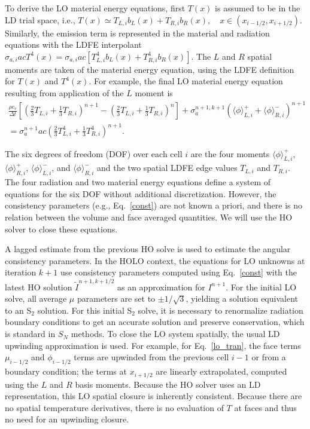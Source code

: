 \documentclass{mc2013}
\newcommand{\mom}[1]{\langle #1 \rangle}
\newcommand{\ir}{{i+1/2}}
\begin{document}
To derive the LO material energy equations, first $T(x)$ is assumed to be in the LD trial space, i.e.,
$ T(x) \simeq T_{L,i} b_L(x) + T_{R,i} b_R(x),\quad x\in(x_{i-1/2},x_\ir)$.
Similarly, the emission term is represented in the material and radiation equations with the LDFE
interpolant $\sigma_{a,i}acT^4(x) = \sigma_{a,i}ac\left[T_{L,i}^4 b_{L}(x) +
T_{R,i}^4 b_R(x)\right]$.  
 The $L$ and $R$ spatial moments are taken of the material energy equation, using the
 LDFE
 definition for $T(x)$ and $T^4(x)$. For example, the final LO material energy
 equation resulting from application of the $L$ moment is
\begin{multline}
    \frac{\rho c_v}{\Delta t}\left[ \left(\frac{2}{3}T_{L,i} + \frac{1}{3}T_{R,i}
        \right)^{n+1} - \left(\frac{2}{3}T_{L,i} + \frac{1}{3}T_{R,i}
    \right)^{n} \right]  + \sigma_a^{n+1,k+1} \left( \mom{\phi}_{L,i}^+ +
    \mom{\phi}_{R,i}^- \right)^{n+1} \\ = \sigma_a^{n+1}a c
\left( \frac{2}{3} T_{L,i}^4 + \frac{1}{3}T_{R,i}^4
        \right)^{n+1}.
\end{multline}


The six degrees of freedom (DOF) over each cell $i$ are the four moments $\mom{\phi}_{L,i}^+$,
$\mom{\phi}_{R,i}^+$, $\mom{\phi}_{L,i}^-$, and $\mom{\phi}_{R,i}^-$ and the two
spatial LDFE edge values $T_{L,i}$ and $T_{R,i}$. The four radiation and two material
energy equations define a system of equations for the six DOF without additional
discretization.  However, the consistency parameters (e.g., Eq.~\eqref{const}) are not known a priori, and
there is no relation between the volume and face averaged quantities. We will use the
HO solver to close these equations.  

A lagged estimate from the previous HO solve is
used to estimate the angular consistency parameters. In the HOLO
context, the equations for LO unknowns at iteration $k+1$ use consistency parameters
computed using Eq.~\eqref{const} with the latest HO solution $\tilde{I}^{n+1,k+1/2}$
as an approximation for $I^{n+1}$. For the initial LO
solve, all average $\mu$ parameters are
set to $\pm 1/\sqrt{3}$, yielding a solution equivalent to an S$_2$ solution.  For this initial S$_2$ solve, it is necessary
to renormalize radiation boundary conditions to get an accurate solution and preserve
conservation, which is standard in $S_N$ methods.
To close the LO system spatially, the usual LD upwinding
approximation is used.  For example, for Eq.~\eqref{lo_tran}, the face terms $\mu_{i-1/2}$ and $\phi_{i-1/2}$
terms are upwinded from the previous cell $i-1$ or from a boundary condition; the terms
at $x_{i+1/2}$ are linearly extrapolated, computed using the $L$ and $R$ basis moments.
Because the HO
solver uses an LD representation, this LO spatial closure is inherently
consistent.  Because there are no
spatial temperature derivatives, there is no evaluation of $T$ at faces and thus no need for an
upwinding closure.  
\end{document}
